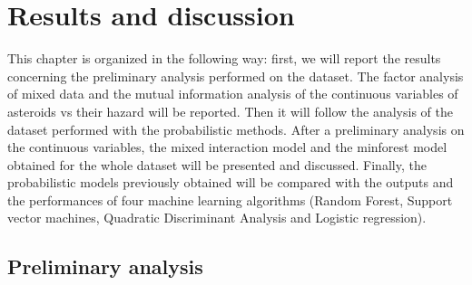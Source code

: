 \documentclass[12pt,%
               a4paper,%
               oneside,openany,%
               titlepage,%
               headinclude,footinclude,%
               BCOR5mm,%
               cleardoublepage=empty,%
               tablecaptionabove,%
               floatperchapter,
               ]{scrreprt}                 %
\begin{document}
\chapter{Results and discussion}

This chapter is organized in the following way: first, we will report the results concerning the preliminary analysis performed on the dataset. The factor analysis of mixed data and the mutual information analysis of the continuous variables of asteroids vs their hazard will be reported. Then it will follow the analysis of the dataset performed with the probabilistic methods. After a preliminary analysis on the continuous variables, the mixed interaction model and the minforest model obtained for the whole dataset will be presented and discussed. Finally, the probabilistic models previously obtained will be compared with the outputs and the performances of four machine learning algorithms (Random Forest, Support vector machines, Quadratic Discriminant Analysis and Logistic regression).

\section{Preliminary analysis}
\end{document}
